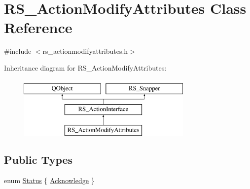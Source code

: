 \hypertarget{classRS__ActionModifyAttributes}{\section{R\-S\-\_\-\-Action\-Modify\-Attributes Class Reference}
\label{classRS__ActionModifyAttributes}
}


{\ttfamily \#include $<$rs\-\_\-actionmodifyattributes.\-h$>$}

Inheritance diagram for R\-S\-\_\-\-Action\-Modify\-Attributes\-:\begin{figure}[H]
\begin{center}
\leavevmode
\includegraphics[height=3.000000cm]{classRS__ActionModifyAttributes}
\end{center}
\end{figure}
\subsection*{Public Types}
\begin{DoxyCompactItemize}
\item 
enum \hyperlink{classRS__ActionModifyAttributes_a43906273bc466b948a3026a84bcddce6}{Status} \{ \hyperlink{classRS__ActionModifyAttributes_a43906273bc466b948a3026a84bcddce6a143d441c8e4570733842593b0fe8d0b8}{Acknowledge}
 \}
\end{DoxyCompactItemize}
